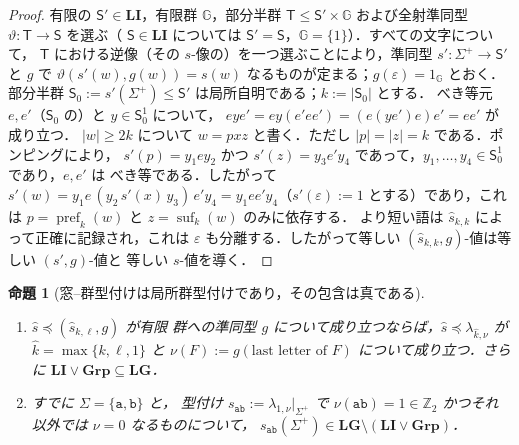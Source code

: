 \documentclass[11pt,a4paper]{ltjsarticle}
\numberwithin{equation}{section}
\theoremstyle{plain}
\newtheorem{proposition}[theorem]{命題}
\theoremstyle{definition}
\theoremstyle{remark}
\newcommand{\eps}{\varepsilon}
\theoremstyle{plain}
\begin{document}
\begin{proof}
有限の $\mathsf S'\in\mathbf{LI}$，有限群 ${\mathbb G}$，部分半群
$\mathsf T\le \mathsf S'\times {\mathbb G}$ および全射準同型 $\vartheta:\mathsf T\to\mathsf S$ を選ぶ（
$\mathsf S\in\mathbf{LI}$ については $\mathsf S'=\mathsf S$，${\mathbb G}=\{1\}$）．すべての文字について，
$\mathsf T$ における逆像（その $s$-像の）を一つ選ぶことにより，準同型 $s':\Sigma^+\to\mathsf S'$ と $g$ で
$\vartheta(s'(w),g(w))=s(w)$ なるものが定まる；$g(\eps)=1_{\mathbb G}$ とおく．部分半群
$\mathsf S_0:=s'(\Sigma^+)\le \mathsf S'$ は局所自明である；$k:=|\mathsf S_0|$ とする．
べき等元 $e,e'$（$\mathsf S_0$ の）と $y\in \mathsf S_0^1$ について，
$eye'=ey(e'ee')=(e(ye')e)e'=ee'$ が成り立つ．
$|w|\ge2k$ について $w=pxz$ と書く．ただし $|p|=|z|=k$ である．ポンピングにより，
$s'(p)=y_1ey_2$ かつ $s'(z)=y_3e'y_4$ であって，$y_1,\ldots,y_4\in \mathsf S_0^1$ であり，$e,e'$ は
べき等である．したがって $s'(w)=y_1e\,(y_2\,s'(x)\,y_3)\,e'y_4=y_1ee'y_4$（$s'(\eps):=1$ とする）であり，これは
$p=\operatorname{pref}_k(w)$ と $z=\operatorname{suf}_k(w)$ のみに依存する．
より短い語は $\widehat s_{k,k}$ によって正確に記録され，これは
$\eps$ も分離する．したがって等しい $(\widehat s_{k,k},g)$-値は等しい $(s',g)$-値と
等しい $s$-値を導く．
\end{proof}

\begin{proposition}[窓--群型付けは局所群型付けであり，その包含は真である]
\label{prop:li-g-strict}
\begin{enumerate}[label=\textup{(\roman*)},leftmargin=*]
\item $\widehat s\preceq(\widehat s_{k,\ell},g)$ が有限
群への準同型 $g$ について成り立つならば，$\widehat s\preceq\lambda_{\hat k,\nu}$ が $\hat k=\max\{k,\ell,1\}$ と
$\nu(F):=g(\text{last letter of }F)$ について成り立つ．さらに $\mathbf{LI}\vee\mathbf{Grp}\subseteq\mathbf{LG}$．
\item すでに $\Sigma=\{\mathtt a,\mathtt b\}$ と，
型付け $s_{\mathtt{ab}}:=\lambda_{1,\nu}|_{\Sigma^+}$ で
$\nu(\mathtt{ab})=1\in\mathbb Z_2$ かつそれ以外では $\nu=0$ なるものについて，
$s_{\mathtt{ab}}(\Sigma^+)\in\mathbf{LG}\setminus(\mathbf{LI}\vee\mathbf{Grp})$．
\end{enumerate}
\end{proposition}
\end{document}
